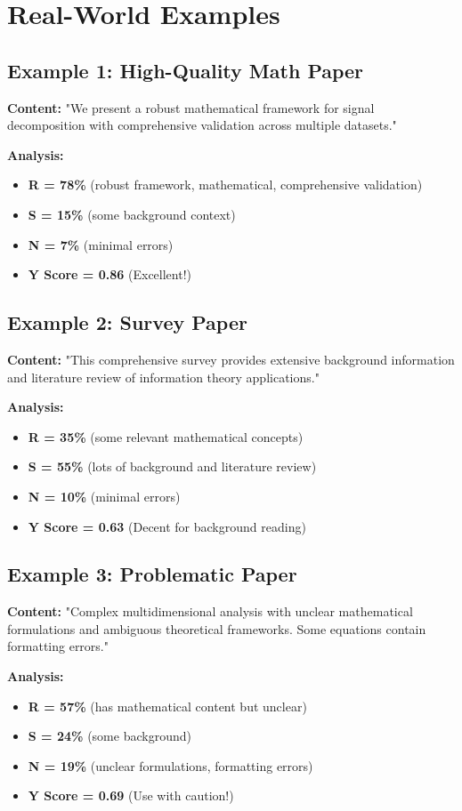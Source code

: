 \documentclass[11pt,a4paper]{article}
\begin{document}
\section{Real-World Examples}

\subsection{Example 1: High-Quality Math Paper}
\textbf{Content:} "We present a robust mathematical framework for signal decomposition with comprehensive validation across multiple datasets."

\textbf{Analysis:}
\begin{itemize}
\item \textbf{R = 78\%} (robust framework, mathematical, comprehensive validation)
\item \textbf{S = 15\%} (some background context)  
\item \textbf{N = 7\%} (minimal errors)
\item \textbf{Y Score = 0.86} (Excellent!)
\end{itemize}

\subsection{Example 2: Survey Paper}
\textbf{Content:} "This comprehensive survey provides extensive background information and literature review of information theory applications."

\textbf{Analysis:}
\begin{itemize}
\item \textbf{R = 35\%} (some relevant mathematical concepts)
\item \textbf{S = 55\%} (lots of background and literature review)
\item \textbf{N = 10\%} (minimal errors)
\item \textbf{Y Score = 0.63} (Decent for background reading)
\end{itemize}

\subsection{Example 3: Problematic Paper}
\textbf{Content:} "Complex multidimensional analysis with unclear mathematical formulations and ambiguous theoretical frameworks. Some equations contain formatting errors."

\textbf{Analysis:}
\begin{itemize}
\item \textbf{R = 57\%} (has mathematical content but unclear)
\item \textbf{S = 24\%} (some background)
\item \textbf{N = 19\%} (unclear formulations, formatting errors)
\item \textbf{Y Score = 0.69} (Use with caution!)
\end{itemize}
\end{document}
